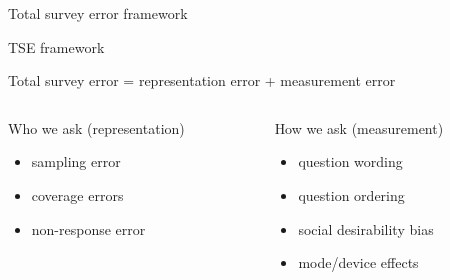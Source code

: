 \documentclass[aspectratio=169]{beamer}
\begin{document}
\begin{frame}


\begin{center}
\LARGE{Total survey error framework}
\end{center}

\end{frame}
\begin{frame}{TSE framework}

Total survey error = representation error + measurement error
\pause
\vspace{1em}

\begin{columns}[T]

\begin{column}{0.45\textwidth}
Who we ask (representation)\\
\begin{itemize}
\item sampling error
\item coverage errors
\item non-response error
\end{itemize}
\end{column}
\pause
\begin{column}{0.45\textwidth}
How we ask (measurement)\\
\begin{itemize}
\item question wording
\item question ordering
\item social desirability bias
\item mode/device effects
\end{itemize}
\end{column}

\end{columns}

\end{frame}
\end{document}
